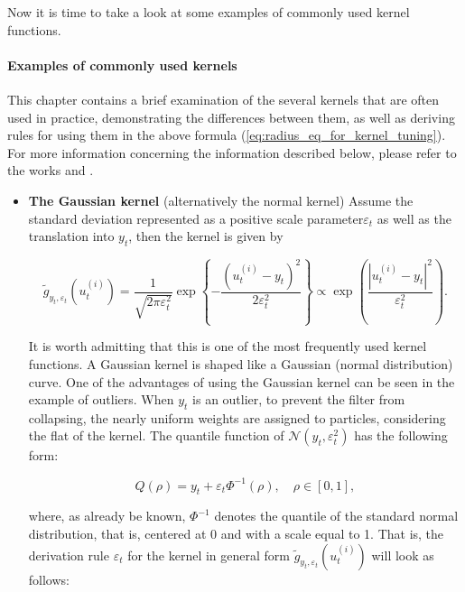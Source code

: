 Now it is time to take a look at some examples of commonly used kernel functions.

\paragraph*{Examples of commonly used kernels} 
This chapter contains a brief examination of the several kernels that are often used in practice, demonstrating the differences between them, as well as deriving rules for using them in the above formula (\ref{eq:radius_eq_for_kernel_tuning}). For more information concerning the information described below, please refer to the works \cite{dedecius_adaptive_2017} and \cite{dedecius_diffusion_2015}.

\begin{itemize}
    \item \textbf{The Gaussian kernel} (alternatively the normal kernel) Assume the standard deviation represented as a positive scale parameter\(\varepsilon_t\) as well as the translation into \(y_t\), then the kernel is given by

    \begin{equation}
        \tilde{g}_{y_t, \varepsilon_t}\left(u_t^{(i)}\right) =  \frac{1}{\sqrt{2 \pi \varepsilon_t^2}} \exp \left\{-\frac{(u_t^{(i)}-y_t)^2}{2 \varepsilon_t^2}\right\} \propto \exp \left(\frac{\left|u_t^{(i)}-y_t\right|^2}{\varepsilon_t^2}\right).
    \end{equation}

    It is worth admitting that this is one of the most frequently used kernel functions. A Gaussian kernel is shaped like a Gaussian (normal distribution) curve. One of the advantages of using the Gaussian kernel can be seen in the example of outliers. When \(y_t\) is an outlier, to prevent the filter from collapsing, the nearly uniform weights are assigned to particles, considering the flat of the kernel. The quantile function of \(\mathcal{N}\left(y_t, \varepsilon_t^2\right)\) has the following form:

    \begin{equation*}
        Q(\rho)=y_t+\varepsilon_t \Phi^{-1}(\rho), \quad \rho \in[0,1],
    \end{equation*}
    
    \noindent where, as already be known, \(\Phi^{-1}\) denotes the quantile of the standard normal distribution, that is, centered at 0 and with a scale equal to 1. That is, the derivation rule \(\varepsilon_t\) for the kernel in general form \(\tilde{g}_{y_t, \varepsilon_t}\left(u_t^{(i)}\right)\) will look as follows:


\end{itemize}
